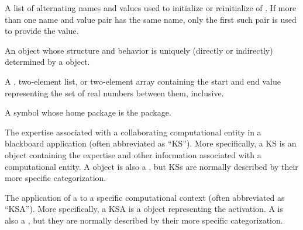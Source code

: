 \documentclass[10pt,twoside,english,pdftex]{article}
\begin{document}
\begin{glossary-list}

%
%
%
A list of alternating names and values used to initialize or reinitialize
 of .  If more than one name and value pair
has the same name, only the first such pair is used to provide the value.


\glent[instance]
%
%
An object whose structure and behavior is uniquely (directly or indirectly)
determined by a  object.


\glent[interval] 
A , two-element list, or two-element array containing the start
and end value representing the set of real numbers between them, inclusive.


%
%
A symbol whose home package is the  package.


%
%
%
%
The expertise associated with a collaborating computational entity in
a blackboard application (often abbreviated as ``KS''). More
specifically, a KS is an object containing the expertise and other
information associated with a computational entity. A  object
is also a , but KSs are normally described
by their more specific categorization.


\glent[KS~activation]
%
%
%
%
%
%
%
%
The application of a  to a specific computational context
(often abbreviated as ``KSA'').  More specifically, a KSA is a
 object representing the  activation.  A
 is also a , but they are normally
described by their more specific categorization.


\end{glossary-list}
\end{document}
